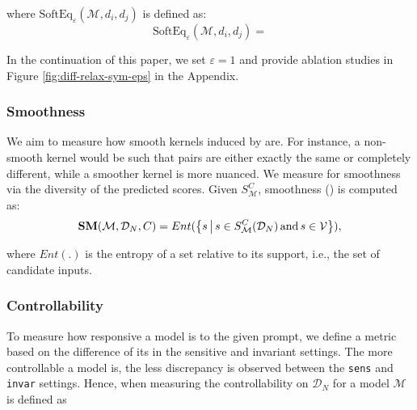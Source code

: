 where $\text{SoftEq}_\varepsilon(\mathcal{M}, d_i, d_j)$ is defined as:
$$
\text{SoftEq}_\varepsilon(\mathcal{M}, d_i, d_j)=
$$


In the continuation of this paper, we set $\varepsilon = 1$ and provide ablation studies in Figure \ref{fig:diff-relax-sym-eps} in the Appendix.

\vspace{-2mm}
\subsubsection{\textbf{Smoothness}}

We aim to measure how smooth kernels induced by \modelss{} are. For instance, a non-smooth kernel would be such that pairs are either exactly the same or completely different, while a smoother kernel is more nuanced. We measure for smoothness via the diversity of the predicted scores. Given $S^{C}_{\mathcal{M}}$, smoothness (\smoothness) is computed as:
$$\textbf{SM}(\mathcal{M}, \mathcal{D}_N, C) = Ent(\left\{s \,\middle|\, s \in S_{\mathcal{M}}^{C}(\mathcal{D}_N)  \,\text{and}\, s \in \mathcal{V}\right\}),$$

where $Ent(.)$ is the entropy of a set relative to its support, i.e., the set of candidate inputs.

\subsubsection{\textbf{Controllability}}

To measure how responsive a model is to the given prompt, we define a metric based on the difference of its \nmi{} in the sensitive and invariant settings. The more controllable a model is, the less discrepancy is observed between the \texttt{sens} and \texttt{invar} settings. Hence, when measuring the controllability on $\mathcal{D}_N$ for a model $\mathcal{M}$ is defined as
\vspace{-5mm}

